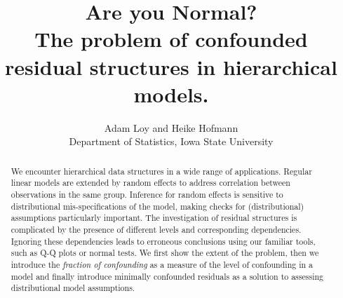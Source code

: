 \documentclass{article} %
\title{Are you Normal? \\ {\Large The problem of confounded residual structures in hierarchical models.}}
\author{
	Adam Loy and Heike Hofmann\\
	Department of Statistics,
	Iowa State University
}
\begin{document}
\maketitle





\begin{abstract}
We encounter hierarchical data structures in a wide range of applications. Regular linear models are extended by random effects to address correlation between observations in the same group. Inference for random effects is sensitive to  distributional mis-specifications of the model, making checks for (distributional) assumptions particularly important.  The investigation of residual structures is complicated by the presence of  different levels and corresponding  dependencies. Ignoring these dependencies leads to  erroneous conclusions using our familiar tools, such as Q-Q plots or normal tests. We first show the extent of the problem, then we introduce the {\it fraction of confounding} as a measure of the level of confounding in a model and finally introduce minimally confounded residuals as a solution to assessing distributional model assumptions.


\end{abstract}

\end{document}
